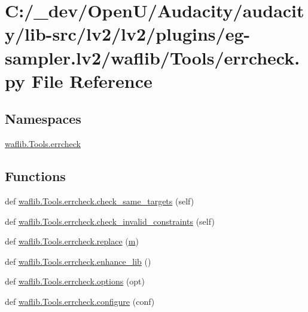 \hypertarget{lv2_2plugins_2eg-sampler_8lv2_2waflib_2_tools_2errcheck_8py}{}\section{C\+:/\+\_\+dev/\+Open\+U/\+Audacity/audacity/lib-\/src/lv2/lv2/plugins/eg-\/sampler.lv2/waflib/\+Tools/errcheck.py File Reference}
\label{lv2_2plugins_2eg-sampler_8lv2_2waflib_2_tools_2errcheck_8py}
\subsection*{Namespaces}
\begin{DoxyCompactItemize}
\item 
 \hyperlink{namespacewaflib_1_1_tools_1_1errcheck}{waflib.\+Tools.\+errcheck}
\end{DoxyCompactItemize}
\subsection*{Functions}
\begin{DoxyCompactItemize}
\item 
def \hyperlink{namespacewaflib_1_1_tools_1_1errcheck_abfda92de66a72045068f150db1f86e29}{waflib.\+Tools.\+errcheck.\+check\+\_\+same\+\_\+targets} (self)
\item 
def \hyperlink{namespacewaflib_1_1_tools_1_1errcheck_a77b03ce1d3ecfd9295275ce9685d1c80}{waflib.\+Tools.\+errcheck.\+check\+\_\+invalid\+\_\+constraints} (self)
\item 
def \hyperlink{namespacewaflib_1_1_tools_1_1errcheck_a3c373d095646ee41f81dd43ade9e0b63}{waflib.\+Tools.\+errcheck.\+replace} (\hyperlink{layer3_8c_a4b8bfe70f28d6faddcb10d6ecf8c1989}{m})
\item 
def \hyperlink{namespacewaflib_1_1_tools_1_1errcheck_a7752dc841ad9140b7f0dc591120a6a0d}{waflib.\+Tools.\+errcheck.\+enhance\+\_\+lib} ()
\item 
def \hyperlink{namespacewaflib_1_1_tools_1_1errcheck_ac059af9fc4bbe227373b3081aef0221d}{waflib.\+Tools.\+errcheck.\+options} (opt)
\item 
def \hyperlink{namespacewaflib_1_1_tools_1_1errcheck_a8456470882cfc53f245e965934344c2f}{waflib.\+Tools.\+errcheck.\+configure} (conf)
\end{DoxyCompactItemize}
